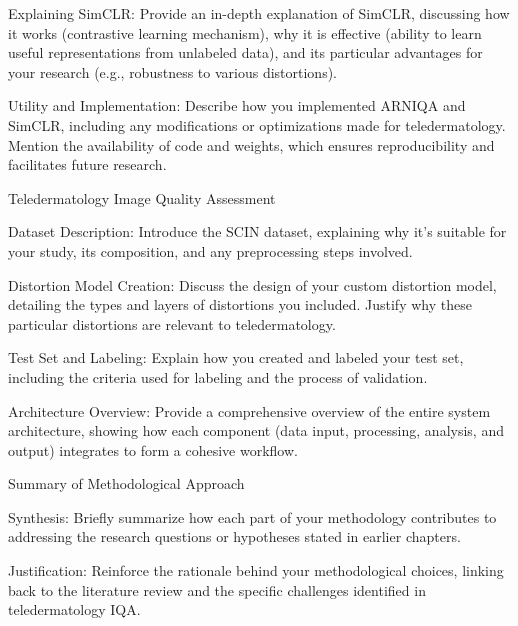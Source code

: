 \noindent
Explaining SimCLR: Provide an in-depth explanation of SimCLR, discussing how it works (contrastive learning mechanism), why it is effective (ability to learn useful representations from unlabeled data), and its particular advantages for your research (e.g., robustness to various distortions).\par
\noindent
Utility and Implementation: Describe how you implemented ARNIQA and SimCLR, including any modifications or optimizations made for teledermatology. Mention the availability of code and weights, which ensures reproducibility and facilitates future research.\par
\noindent
Teledermatology Image Quality Assessment \par
Dataset Description: Introduce the SCIN dataset, explaining why it's suitable for your study, its composition, and any preprocessing steps involved.\par
\noindent
Distortion Model Creation: Discuss the design of your custom distortion model, detailing the types and layers of distortions you included. Justify why these particular distortions are relevant to teledermatology.\par
\noindent
Test Set and Labeling: Explain how you created and labeled your test set, including the criteria used for labeling and the process of validation.\par
\noindent
Architecture Overview: Provide a comprehensive overview of the entire system architecture, showing how each component (data input, processing, analysis, and output) integrates to form a cohesive workflow. \par
\noindent
Summary of Methodological Approach \par
Synthesis: Briefly summarize how each part of your methodology contributes to addressing the research questions or hypotheses stated in earlier chapters.\par
\noindent
Justification: Reinforce the rationale behind your methodological choices, linking back to the literature review and the specific challenges identified in teledermatology IQA.\par